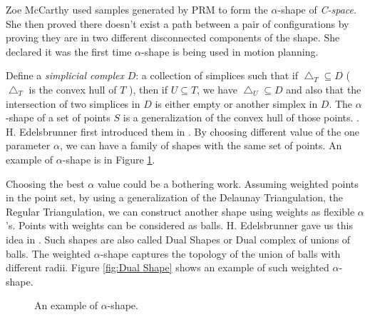 \documentclass[11pt]{article}
\begin{document}
\indent Zoe McCarthy \cite{PathNonexistance} used samples generated by PRM to form the $\alpha$-shape of \emph{C-space}. She then proved there doesn't exist a path between a pair of configurations by proving they are in two different disconnected components of the shape. She declared it was the first time $\alpha$-shape is being used in motion planning.

\indent Define a \emph{simplicial complex} $D$: a collection of simplices such that if $\bigtriangleup_T \subseteq D$ ( $\bigtriangleup_T$ is the convex hull of $T$ ), then if $U \subseteq T$, we have $\bigtriangleup_U \subseteq D$ and also that the intersection of two simplices in $D$ is either empty or another simplex in $D$. The $\alpha$-shape of a set of points $S$ is a generalization of the convex hull of those points. \cite{PathNonexistance}. H. Edelsbrunner first introduced them in \cite{PointSetShape}. By choosing different value of the one parameter $\alpha$, we can have a family of shapes with the same set of points. An example of $\alpha$-shape is in Figure \ref{fig:Alpha-shape}.

\indent Choosing the best $\alpha$ value could be a bothering work. Assuming weighted points in the point set, by using a generalization of the Delaunay Triangulation, the Regular Triangulation, we can construct another shape using weights as flexible $\alpha$'s. Points with weights can be considered as balls. H. Edelsbrunner gave us this idea in \cite{DualShape}. Such shapes are also called Dual Shapes or Dual complex of unions of balls. The weighted $\alpha$-shape captures the topology of the union of balls with different radii. Figure \ref{fig:Dual Shape} shows an example of such weighted $\alpha$-shape.

\begin{figure}
	\caption{\label{fig:Alpha-shape} An example of $\alpha$-shape. \cite{PointSetShape}}
\end{figure}
\end{document}

